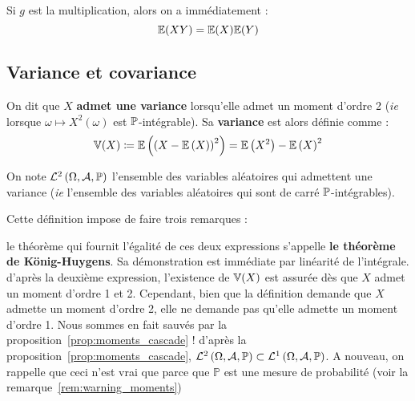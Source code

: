 \documentclass[../integ-proba.tex]{subfiles}
\begin{document}
    \begin{rem}
        Si $g$ est la multiplication, alors on a immédiatement :
        \begin{displaymath}
            \mathbb{E}(XY) = \mathbb{E}(X)\mathbb{E}(Y)
        \end{displaymath}
    \end{rem}

    \subsection{Variance et covariance}

    \begin{defi}
        On dit que $X$ \textbf{admet une variance} lorsqu'elle admet un moment d'ordre 2 (\textit{ie} lorsque $\omega \mapsto X^2\left(\omega\right)$ est $\mathbb{P}$-intégrable).
        Sa \textbf{variance} est alors définie comme :
        \begin{displaymath}
            \mathbb{V}(X)\coloneqq\mathbb{E}\left(\left(X - \mathbb{E}\left(X\right)\right)^2\right)=\mathbb{E}\left(X^2\right) - \mathbb{E}\left(X\right)^2
        \end{displaymath}

        On note $\mathcal{L}^2\left(\Omega, \mathcal{A}, \mathbb{P}\right)$ l'ensemble des variables aléatoires qui admettent une variance (\textit{ie} l'ensemble des variables aléatoires qui sont de carré $\mathbb{P}$-intégrables).
    \end{defi}

    \begin{rem}
        Cette définition impose de faire trois remarques :
        \begin{itemize}
            \itemb le théorème qui fournit l'égalité de ces deux expressions s'appelle \textbf{le théorème de König-Huygens}.
            Sa démonstration est immédiate par linéarité de l'intégrale.
            \itemb d'après la deuxième expression, l'existence de $\mathbb{V}(X)$ est assurée dès que $X$ admet un moment d'ordre 1 et 2.
            Cependant, bien que la définition demande que $X$ admette un moment d'ordre 2, elle ne demande pas qu'elle admette un moment d'ordre 1.
            Nous sommes en fait sauvés par la proposition~\ref{prop:moments_cascade} !
            \itemb d'après la proposition~\ref{prop:moments_cascade}, $\mathcal{L}^2\left(\Omega, \mathcal{A}, \mathbb{P}\right) \subset \mathcal{L}^1\left(\Omega, \mathcal{A}, \mathbb{P}\right)$.
            A nouveau, on rappelle que ceci n'est vrai que parce que $\mathbb{P}$ est une mesure de probabilité (voir la remarque~\ref{rem:warning_moments})
        \end{itemize}
    \end{rem}
\end{document}
